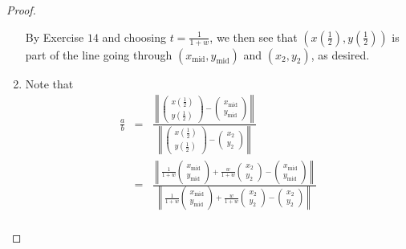 \begin{proof}
\begin{enumerate}
    By Exercise $14$ and choosing $t = \frac{1}{1+w}$, we then see that $\left(x\left(\frac{1}{2}\right),y\left(\frac{1}{2}\right)\right)$ is part of the line going through $(x_{\text{mid}},y_{\text{mid}})$ and $(x_2,y_2)$, as desired.
    \item Note that
    \begin{eqnarray*}
        \frac{a}{b}
        & = & \frac{\left\|\left(\begin{array}{c} x\left(\frac{1}{2}\right)\\ y\left(\frac{1}{2}\right)\end{array}\right) - \left(\begin{array}{c} x_{\text{mid}}\\ y_{\text{mid}}\end{array}\right)\right\|}{\left\|\left(\begin{array}{c} x\left(\frac{1}{2}\right)\\ y\left(\frac{1}{2}\right)\end{array}\right) - \left(\begin{array}{c} x_2\\ y_2\end{array}\right)\right\|}\\
        & = & \frac{\left\|\frac{1}{1+w}\left(\begin{array}{c} x_{\text{mid}}\\ y_{\text{mid}}\end{array}\right) + \frac{w}{1+w}\left(\begin{array}{c} x_2\\ y_2\end{array}\right) - \left(\begin{array}{c} x_{\text{mid}}\\ y_{\text{mid}}\end{array}\right)\right\|}{\left\|\frac{1}{1+w}\left(\begin{array}{c} x_{\text{mid}}\\ y_{\text{mid}}\end{array}\right) + \frac{w}{1+w}\left(\begin{array}{c} x_2\\ y_2\end{array}\right) - \left(\begin{array}{c} x_2\\ y_2\end{array}\right)\right\|}\\        

\end{eqnarray*}
\end{enumerate}
\end{proof}
